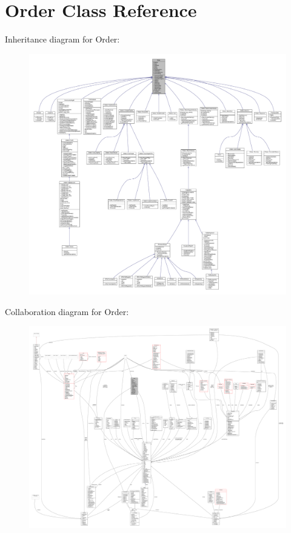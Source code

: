 \hypertarget{classOrder}{}\section{Order Class Reference}
\label{classOrder}


Inheritance diagram for Order\+:
\nopagebreak
\begin{figure}[H]
\begin{center}
\leavevmode
\includegraphics[width=350pt]{d2/d82/classOrder__inherit__graph}
\end{center}
\end{figure}


Collaboration diagram for Order\+:
\nopagebreak
\begin{figure}[H]
\begin{center}
\leavevmode
\includegraphics[width=350pt]{dc/de0/classOrder__coll__graph}
\end{center}
\end{figure}

